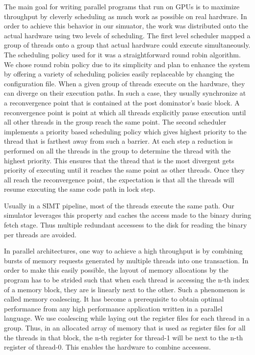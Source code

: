 \documentclass[conference, 10pt]{IEEEtran}
\begin{document}
The main goal for writing parallel programs that run on GPUs is to maximize throughput by 
cleverly scheduling as much work as possible on real hardware. In order to achieve this 
behavior in our simuator, the work was distributed onto the actual hardware using two levels of
scheduling. The first level scheduler mapped a group of threads onto a group that actual hardware 
could execute simultaneously. The scheduling policy used for it was a straightforward round 
robin algorithm. We chose round robin policy due to its simplicity and plan to enhance the system by 
offering a variety of scheduling policies easily replaceable by changing the configuration file.
When a given group of threads execute on the hardware, they can diverge on their execution paths. 
In such a case, they usually synchronize at a reconvergence point that is contained at the post dominator's 
basic block. A reconvergence point is point at which all threads explicitly pause execution 
until all other threads in the group reach the same point. The second scheduler implements a 
priority based scheduling policy which gives highest priority to the thread that is farthest 
away from such a barrier. At each step a reduction is performed on all the threads in the 
group to determine the thread with the highest priority. This ensures that the thread that is 
the most divergent gets priority of executing until it reaches the same point as other threads. 
Once they all reach the reconvergence point, the expectation is that all the threads will resume 
executing the same code path in lock step. 
  
Usually in a SIMT pipeline, most of the threads execute the same path. Our simulator 
leverages this property and caches the access made to the binary during fetch stage. Thus
multiple redundant accessess to the disk for reading the binary per threads are avoided.

In parallel architectures, one way to achieve a high throughput is by combining bursts of 
memory requests generated by multiple threads into one transaction. In order to make this 
easily possible, the layout of memory allocations by the program has to be strided such 
that when each thread is accessing the n-th index of a memory block, they are is linearly 
next to the other. Such a phenomenon is called memory coalescing. It has become a prerequisite 
to obtain optimal performance from any high performance application written in a parallel language. 
We use coalescing while laying out the register files for each thread in a group. Thus, in an 
allocated array of memory that is used as register files for all the threads in that block, the 
n-th register for thread-1 will be next to the n-th register of thread-0. This enables the 
hardware to combine accessess.
\end{document}

